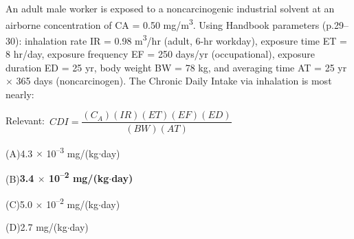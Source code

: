 \documentclass[11pt]{article}
\newcommand{\correct}[1]{\textbf{#1}\;{\color{accent}$\checkmark$}}
\newcommand{\optline}[2]{\par\noindent\hspace{1.2em}(#1)\hspace{0.6em}#2}
\begin{document}
An adult male worker is exposed to a noncarcinogenic industrial solvent at an airborne concentration of CA = 0.50 mg/m\textsuperscript{3}. Using Handbook parameters (p.29--30): inhalation rate IR = 0.98 m\textsuperscript{3}/hr (adult, 6-hr workday), exposure time ET = 8 hr/day, exposure frequency EF = 250 days/yr (occupational), exposure duration ED = 25 yr, body weight BW = 78 kg, and averaging time AT = 25 yr $\times$ 365 days (noncarcinogen). The Chronic Daily Intake via inhalation is most nearly:\par\vspace{3pt}
{\small\color{soft}Relevant:}\ $CDI = \dfrac{(C_A)(IR)(ET)(EF)(ED)}{(BW)(AT)}$\par\vspace{3pt}
\optline{A}{4.3 $\times$ 10\textsuperscript{--}\textsuperscript{3} mg/(kg$\cdot$day)}
\optline{B}{\correct{3.4 $\times$ 10\textsuperscript{--}\textsuperscript{2} mg/(kg$\cdot$day)}}
\optline{C}{5.0 $\times$ 10\textsuperscript{--}\textsuperscript{2} mg/(kg$\cdot$day)}
\optline{D}{2.7 mg/(kg$\cdot$day)}
\par\vspace{3pt}
\end{document}
